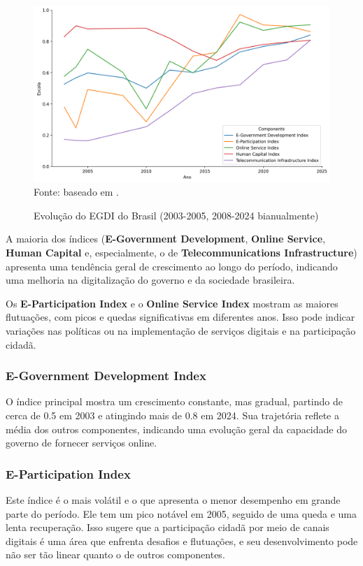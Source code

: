 \begin{figure}[H]
	\centering
	\caption{Evolução do EGDI do Brasil (2003-2005, 2008-2024 bianualmente)}
	\includegraphics[width=1\linewidth]{figuras/egdi/lineplot_egdi_brasil.png}
	\label{fig:lineplot_egdi_brasil}
	\footnotesize{Fonte: baseado em \cite{ONU_EGDI_mapa}.}
\end{figure}

A maioria dos índices (\textbf{E-Government Development}, \textbf{Online Service},  \textbf{Human Capital} e, especialmente, o de  \textbf{Telecommunications Infrastructure}) apresenta uma tendência geral de crescimento ao longo do período, indicando uma melhoria na digitalização do governo e da sociedade brasileira.

Os  \textbf{E-Participation Index} e o \textbf{Online Service Index} mostram as maiores flutuações, com picos e quedas significativas em diferentes anos. Isso pode indicar variações nas políticas ou na implementação de serviços digitais e na participação cidadã.

\subsubsection{E-Government Development Index} O índice principal mostra um crescimento constante, mas gradual, partindo de cerca de 0.5 em 2003 e atingindo mais de 0.8 em 2024. Sua trajetória reflete a média dos outros componentes, indicando uma evolução geral da capacidade do governo de fornecer serviços online.

\subsubsection{E-Participation Index} Este índice é o mais volátil e o que apresenta o menor desempenho em grande parte do período. Ele tem um pico notável em 2005, seguido de uma queda e uma lenta recuperação. Isso sugere que a participação cidadã por meio de canais digitais é uma área que enfrenta desafios e flutuações, e seu desenvolvimento pode não ser tão linear quanto o de outros componentes.

